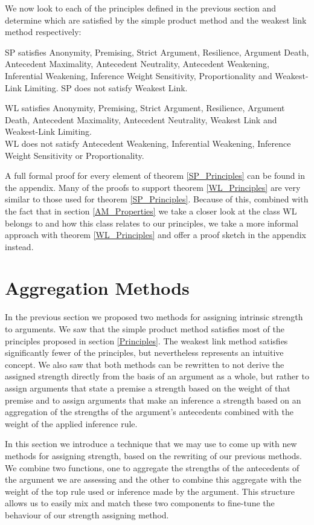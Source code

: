 \documentclass[runningheads]{llncs}
\begin{document}
We now look to each of the principles defined in the previous section and determine which are satisfied by the simple product method and the weakest link method respectively:
\begin{theorem}\label{SP_Principles}
SP satisfies Anonymity, Premising, Strict Argument, Resilience, Argument Death, Antecedent Maximality, Antecedent Neutrality, Antecedent Weakening, Inferential Weakening, Inference Weight Sensitivity, Proportionality and Weakest-Link Limiting. SP does not satisfy %
Weakest Link.
\end{theorem}
\begin{theorem}\label{WL_Principles}
WL satisfies Anonymity, Premising, Strict Argument, Resilience, Argument Death, Antecedent Maximality, Antecedent Neutrality, Weakest Link and Weakest-Link Limiting.\\
WL does not satisfy Antecedent Weakening, Inferential Weakening, Inference Weight Sensitivity or Proportionality.%
\end{theorem}

A full formal proof for every element of theorem \ref{SP_Principles} can be found in the appendix. Many of the proofs to support theorem \ref{WL_Principles} are very similar to those used for theorem \ref{SP_Principles}. Because of this, combined with the fact that in section \ref{AM_Properties} we take a closer look at the class WL belongs to and how this class relates to our principles, we take a more informal approach with theorem \ref{WL_Principles} and offer a proof sketch in the appendix instead.
%
\section{Aggregation Methods}
In the previous section we proposed two methods for assigning intrinsic strength to arguments. We saw that the simple product method satisfies most of the principles proposed in section \ref{Principles}. The weakest link method satisfies significantly fewer of the principles, but nevertheless represents an intuitive concept. We also saw that both methods can be rewritten to not derive the assigned strength directly from the basis of an argument as a whole, but rather to assign arguments that state a premise a strength based on the weight of that premise and to assign arguments that make an inference a strength based on an aggregation of the strengths of the argument's antecedents combined with the weight of the applied inference rule.

In this section we introduce a technique that we may use to come up with new methods for assigning strength, based on the rewriting of our previous methods. We combine two functions, one to aggregate the strengths of the antecedents of the argument we are assessing and the other to combine this aggregate with the weight of the top rule used or inference made by the argument. This structure allows us to easily mix and match these two components to fine-tune the behaviour of our strength assigning method.
\end{document}
